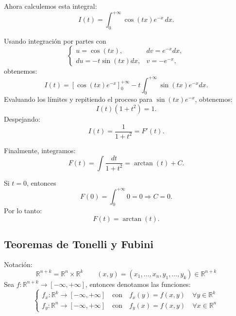 {Ahora calculemos esta integral:
\[ I(t) = \int_{0}^{+\infty} \cos(tx) e^{-x} \,dx. \]

Usando integración por partes con
\[
    \begin{cases}
        u = \cos(tx),      & dv = e^{-x}dx, \\
        du = -t\sin(tx)dx, & v = -e^{-x},
    \end{cases}
\]
obtenemos:
\[ I(t) = [\cos(tx) e^{-x}]_{0}^{+\infty} - t \int_{0}^{+\infty} \sin(tx) e^{-x}dx. \]
Evaluando los límites y repitiendo el proceso para \( \sin(tx) e^{-x} \),
obtenemos:
\[ I(t) (1+t^2) = 1. \]
Despejando:
\[ I(t) = \frac{1}{1+t^2} = F'(t). \]

Finalmente, integramos:
\[ F(t) = \int \frac{dt}{1+t^2} = \arctan(t) + C. \]

Si \( t = 0 \), entonces
\[ F(0) = \int_{0}^{+\infty} 0 = 0 \Rightarrow C = 0. \]
Por lo tanto:
\[ F(t) = \arctan(t). \]
}

\subsection{Teoremas de Tonelli y Fubini}

Notación:
\[
    \mathbb{R}^{n+k} = \mathbb{R}^n \times \mathbb{R}^k \qquad (x, y)
    = (x_1, \dots, x_n, y_1, \dots, y_k) \in \mathbb{R}^{n+k}
\]
Sea $f: \mathbb{R}^{n+k} \to [-\infty, +\infty]$, entonces denotamos las
funciones:
\[
    \begin{cases}
        f_{x}: \mathbb{R}^k \to [-\infty,+ \infty] \quad \text{con} \quad f_{x}(y) = f(x, y) \quad \forall y \in \mathbb{R}^k \\
        f_{y}: \mathbb{R}^n \to [-\infty,+ \infty] \quad \text{con} \quad f_{y}(x) = f(x, y) \quad \forall x \in \mathbb{R}^n
    \end{cases}
\]

